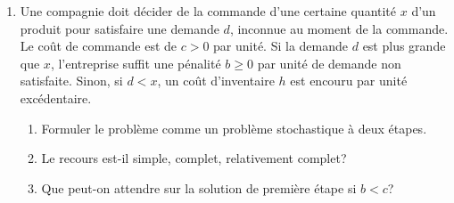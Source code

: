 \documentclass[12pt]{book}
\def\cR {\mathcal{R}}
\def\bxi {\boldsymbol{\xi}}
\newcounter {exercisecount}[section]
\newenvironment {exercise}{}{}%
\begin{document}
\begin{enumerate}
Nous avons aussi
\[
y_2 - s_1 = z_1 - y_1.
\]
En utilisant nos précédents choix, nous pouvons prendre pour $y_2$ ce
qui suit. Si $z_2 \geq 0$, $y_2 - s_1 = z_1 - z_2$, et nous prenons
\[
\begin{cases}
y_2 = z_1-z_2,\ s_1 = 0 & \mbox{si } z_1-z_2 \geq 0,\\
y_2 = 0,\ s_2 = z_2-z_1 & \mbox{sinon}.\\
\end{cases}
\]
De même, si $z_2 \leq 0$, $y_2 - s_1 = z_1$, et il suffit de choisir
\[
\begin{cases}
y_2 = z_1,\ s_1 = 0 & \mbox{si } z_1 \geq 0,\\
y_2 = 0,\ s_2 = -z_1 & \mbox{sinon}.\\
\end{cases}
\]

Par conséquent, quel que soit $z$, on peut trouver une solution
non-négative au système
\[
W\begin{pmatrix} y \\ s \end{pmatrix} = z,
\]
i.e. le recours est complet!

Prendre $\bxi$ d'espérance finie permet de garantir que $K_2 = \cR^n$.

\item

\begin{exercise}
	Une compagnie doit décider de la commande d'une certaine quantité $x$ d'un produit pour satisfaire une demande $d$, inconnue au moment de la commande.
	Le coût de commande est de $c > 0$ par unité.
	Si la demande $d$ est plus grande que $x$, l'entreprise suffit une pénalité $b \geq 0$ par unité de demande non satisfaite.
	Sinon, si $d < x$, un coût d'inventaire $h$ est encouru par unité excédentaire.
	\begin{enumerate}
		\item
		Formuler le problème comme un problème stochastique à deux étapes.
		\item
		Le recours est-il simple, complet, relativement complet?
		\item
		Que peut-on attendre sur la solution de première étape si $b < c$?
	\end{enumerate}
\end{exercise}


\end{enumerate}
\end{document}
